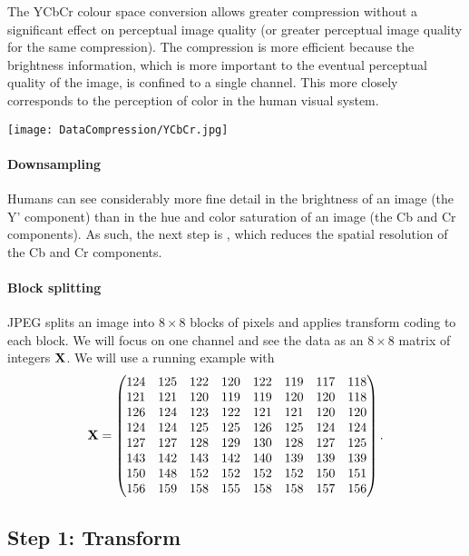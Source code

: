 \documentclass[a4paper, 11pt, openany]{book}
\begin{document}
The YCbCr colour space conversion allows greater compression without a significant effect on perceptual image quality (or greater perceptual image quality for the same compression). The compression is more efficient because the brightness information, which is more important to the eventual perceptual quality of the image, is confined to a single channel. This more closely corresponds to the perception of color in the human visual system.


\texttt{[image: DataCompression/YCbCr.jpg]}


\paragraph{Downsampling}
Humans can see considerably more fine detail in the brightness of an image (the Y' component) than in the hue and color saturation of an image (the Cb and Cr components). As such, the next step is , which reduces the spatial resolution of the Cb and Cr components.



\paragraph{Block splitting}
JPEG splits an image into $8 \times 8$ blocks of pixels and applies transform coding to each block. We will focus on one channel and see the data as an $8 \times 8$ matrix of integers ${\bf X}$. We will use a running example with
\[
    {\bf X} = \begin{pmatrix}
    124 & 125 & 122 & 120 & 122 & 119 & 117 & 118\\
    121 & 121 & 120 & 119 & 119 & 120 & 120 & 118\\
    126 & 124 & 123 & 122 & 121 & 121 & 120 & 120\\
    124 & 124 & 125 & 125 & 126 & 125 & 124 & 124\\
    127 & 127 & 128 & 129 & 130 & 128 & 127 & 125\\
    143 & 142 & 143 & 142 & 140 & 139 & 139 & 139\\
    150 & 148 & 152 & 152 & 152 & 152 & 150 & 151\\
    156 & 159 & 158 & 155 & 158 & 158 & 157 & 156
    \end{pmatrix}.
\]


\subsection{Step 1: Transform}
\end{document}
